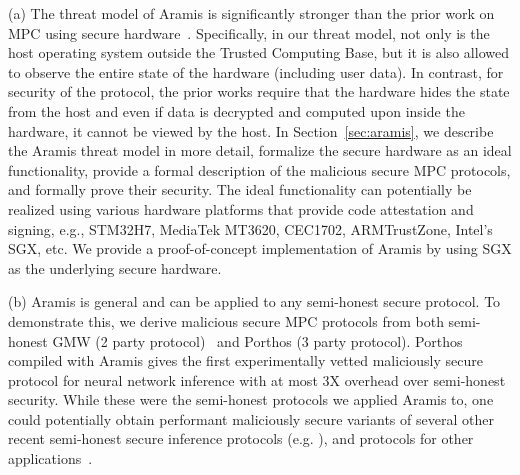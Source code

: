 \begin{tiretnospace}
\item[(a)] The threat model of Aramis is significantly stronger than the prior
work on MPC using secure
hardware~\cite{vc3, obliviousmpml, GuptaFC16, BahmaniFC17,gcsgx,ndss1,ndss2,ndss3,slalom,opaque,chiron}.
Specifically, in our threat model, not only is the host operating system outside the Trusted Computing Base, but it is also allowed to observe
the entire state of the hardware (including user data). 
In contrast, for security of the protocol, the prior works require that the hardware hides the state from  the host and even if data is decrypted and computed upon inside the hardware, it cannot be viewed by the host. In Section~\ref{sec:aramis}, we describe the Aramis threat model in
more detail, formalize the secure hardware as an ideal functionality,
provide a formal description of the malicious secure MPC protocols,
and formally prove their security. The ideal functionality can potentially
 be realized using various hardware platforms that provide
code attestation and signing, e.g., STM32H7, MediaTek MT3620, CEC1702, ARMTrustZone, Intel's SGX, etc.
We provide a proof-of-concept 
implementation of Aramis by using SGX as the underlying secure
hardware. 
\item[(b)] Aramis is general and can be applied to any semi-honest secure \mpc protocol. To demonstrate this, we
derive malicious secure MPC protocols from both semi-honest GMW (2
party protocol)~\cite{gmw} and
Porthos (3 party protocol). Porthos compiled with Aramis gives the
first experimentally vetted maliciously secure protocol for neural
network inference with at most 3X overhead over semi-honest security. 
While these were the semi-honest protocols we applied Aramis to, one could potentially obtain performant maliciously secure variants of several other recent semi-honest secure inference protocols (e.g. \cite{gazelle, delphi, nitin}), and \mpc protocols for other applications~\cite{krtwpsi, pisgoogle}.
\end{tiretnospace}

